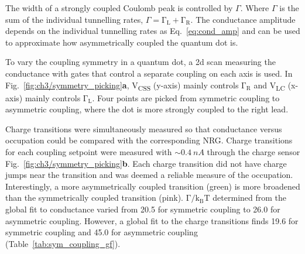 The width of a strongly coupled Coulomb peak is controlled by $\Gamma$. Where $\Gamma$ is the sum of the individual tunnelling rates, $\Gamma=\mathrm{\Gamma_L} + \mathrm{\Gamma_R}$. The conductance amplitude depends on the individual tunnelling rates as Eq.~\ref{eq:cond_amp} and can be used to approximate how asymmetrically coupled the quantum dot is. 





To vary the coupling symmetry in a quantum dot, a 2d scan measuring the conductance with gates that control a separate coupling on each axis is used. In Fig.~\ref{fig:ch3/symmetry_picking}\textbf{a}, V\textsubscript{CSS} (y-axis) mainly controls $\mathrm{\Gamma_R}$ and V\textsubscript{LC} (x-axis) mainly controls $\mathrm{\Gamma_L}$. Four points are picked from symmetric coupling to asymmetric coupling, where the dot is more strongly coupled to the right lead. 

Charge transitions were simultaneously measured so that conductance versus occupation could be compared with the corresponding NRG. 
Charge transitions for each coupling setpoint were measured with $\sim\qty{0.4}{nA}$ through the charge sensor Fig.~\ref{fig:ch3/symmetry_picking}\textbf{b}. 
Each charge transition did not have charge jumps near the transition and was deemed a reliable measure of the occupation. Interestingly, a more asymmetrically coupled transition (green) is more broadened than the symmetrically coupled transition (pink). $\mathrm{\Gamma/k_BT}$ determined from the global fit to conductance varied from 20.5 for symmetric coupling to 26.0 for asymmetric coupling. However, a global fit to the charge transitions finds 19.6 for symmetric coupling and 45.0 for asymmetric coupling (Table~\ref{tab:sym_coupling_gf}). 


